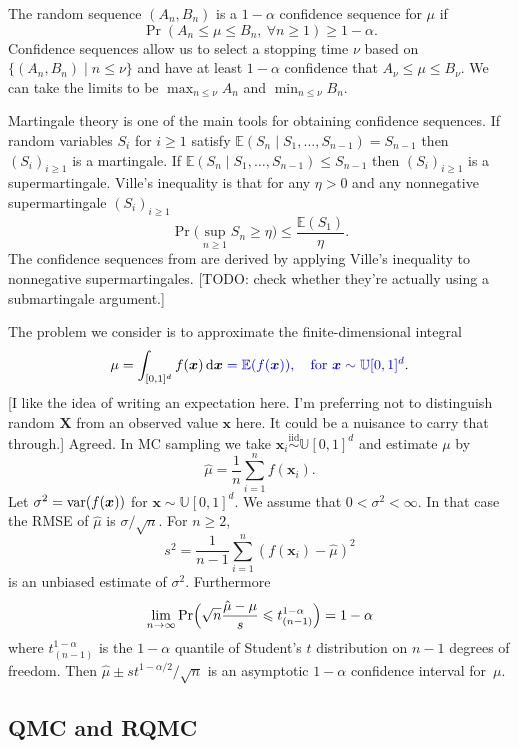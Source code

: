 \documentclass{article}
\newcommand{\art}[1]{\begingroup\color{blue}#1\endgroup}
\newcommand{\fred}[1]{\begingroup\color{red}#1\endgroup}
\renewcommand{\le}{\leqslant}
\renewcommand{\ge}{\geqslant}
\newcommand{\e}{\mathbb{E}}
\newcommand{\bsx}{\boldsymbol{x}}
\newcommand{\simiid}{\stackrel{\mathrm{iid}}{\sim}}
\newcommand{\dunif}{\mathbb{U}}
\newcommand{\giv}{\!\mid\!} %
\newcommand{\rd}{\,\mathrm{d}}
\begin{document}
The random sequence $(A_n,B_n)$ is a $1-\alpha$ confidence sequence
for $\mu$ if
$$
\Pr( A_n \le \mu \le B_n,\ \forall n\ge1)\ge 1-\alpha.
$$
Confidence sequences allow us to select a stopping time
$\nu$ based on $\{(A_n,B_n)\mid n\le\nu\}$ and have
at least $1-\alpha$ confidence that $A_\nu\le \mu\le B_\nu$.
We can take the limits to be $\max_{n\le \nu}A_n$
and $\min_{n\le\nu}B_n$.

Martingale theory is one of the main tools for
obtaining confidence sequences.
If random variables $S_i$ for $i\ge1$
satisfy $\e(S_n\giv S_1,\dots,S_{n-1})=S_{n-1}$
then $(S_i)_{i\ge1}$ is a martingale.
If $\e(S_n\giv S_1,\dots,S_{n-1})\le S_{n-1}$
then $(S_i)_{i\ge1}$ is a supermartingale.
Ville's inequality is that for any $\eta>0$
and any nonnegative supermartingale $(S_i)_{i\ge1}$
$$
\Pr\biggl( \sup_{n\ge1}S_n\ge \eta\biggr)\le\frac{\e(S_1)}\eta.
$$
The confidence sequences from \cite{WauRam24a} are derived
by applying Ville's inequality \cite{vill:1939} to nonnegative supermartingales.
\art{[TODO: check whether they're actually using a submartingale argument.]}


The problem we consider is to approximate the finite-dimensional
integral
$$\mu = \int_{[0,1]^d}f(\bsx)\rd\bsx 
\art{=\e(f(\bsx)),\quad\text{for $\bsx\sim\dunif[0,1]^d$}}.$$
\art{[I like the idea of writing an expectation here. I'm preferring not to distinguish
random $\boldsymbol{X}$ from an observed
value $\bsx$ here. It could be a nuisance to carry
that through.] } \fred{Agreed.}
In MC sampling we take $\bsx_i\simiid \dunif[0,1]^d$ and
estimate $\mu$ by
$$
\hat\mu = \frac1n\sum_{i=1}^nf(\bsx_i).
$$
Let $\sigma^2=\var(f(\bsx))$ for $\bsx\sim\dunif[0,1]^d$.
We assume that $0<\sigma^2<\infty$. In that case the RMSE
of $\hat\mu$ is $\sigma/\sqrt{n}$. For $n\ge2$,
$$s^2 =\frac1{n-1}\sum_{i=1}^n(f(\bsx_i)-\hat\mu)^2$$
is an unbiased estimate of $\sigma^2$. Furthermore
$$
\lim_{n\to\infty}\Pr\Bigl( \sqrt{n}\frac{\hat\mu-\mu}s\le t^{1-\alpha}_{(n-1)}\Bigr) = 1-\alpha
$$
where $t^{1-\alpha}_{(n-1)}$ is the $1-\alpha$ quantile of
Student's $t$ distribution on $n-1$ degrees of freedom.
Then $\hat\mu \pm st^{1-\alpha/2}/\sqrt{n}$ is an
asymptotic $1-\alpha$ confidence interval for~$\mu$.

\subsection{QMC and RQMC}
\end{document}
